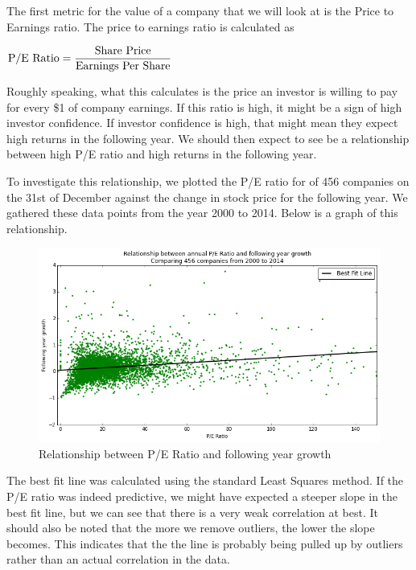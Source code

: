 \documentclass{report}
\begin{document}
The first metric for the value of a company that we will look at is the Price to Earnings ratio. The price to earnings ratio is calculated as

\begin{math}
  \\
	\text{P/E Ratio} = \dfrac{\text{Share Price}}{\text{Earnings Per Share}}
	\\
\end{math}

Roughly speaking, what this calculates is the price an investor is willing to pay for every \$1 of company earnings. If this ratio is high, it might be a sign of high investor confidence. If investor confidence is high, that might mean they expect high returns in the following year. We should then expect to see be a relationship between high P/E ratio and high returns in the following year.

To investigate this relationship, we plotted the P/E ratio for of 456 companies on the 31st of December against the change in stock price for the following year. We gathered these data points from the year 2000 to 2014. Below is a graph of this relationship.

\begin{figure}[H]
	\caption{Relationship between P/E Ratio and following year growth}
	\centerline{\includegraphics[width=\textwidth]{vis/pe-ratio-abs.png}}
	\label{fig:pe-abs}
\end{figure}

The best fit line was calculated using the standard Least Squares method. If the P/E ratio was indeed predictive, we might have expected a steeper slope in the best fit line, but we can see that there is a very weak correlation at best. It should also be noted that the more we remove outliers, the lower the slope becomes. This indicates that the the line is probably being pulled up by outliers rather than an actual correlation in the data. 
\end{document}
